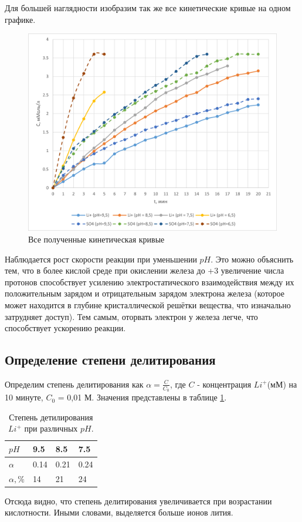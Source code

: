\documentclass[a4paper,12pt]{article} %
\begin{document}
Для большей наглядности изобразим так же все кинетические кривые на одном графике.
\begin{figure}[H]
    \centering
    \includegraphics[scale=1]{Рисунок5.png}
    \caption{Все полученные кинетическая кривые
}
    \label{pic:5}
\end{figure}

Наблюдается рост скорости реакции при уменьшении $pH$. Это можно объяснить тем, что в более кислой среде при окислении железа до +3 увеличение числа протонов способствует усилению электростатического взаимодействия между их положительным зарядом и отрицательным зарядом электрона железа (которое может находится в глубине кристаллической решётки вещества, что изначально затрудняет доступ). Тем самым, оторвать электрон у железа легче, что способствует ускорению реакции.

\subsection{Определение степени делитирования}

Определим степень делитирования как $\alpha = \frac{C}{C_0}$, где $C$ - концентрация $Li^+$(мМ) на 10 минуте, $C_0$ = 0,01 М. Значения представлены в таблице \ref{tab:5}. 

\begin{table}[H]
    \centering
    \begin{tabular}{|l|l|l|l|}
    \hline
        $pH$ & 9.5 & 8.5 & 7.5 \\ \hline
        $\alpha$ & 0.14 & 0.21 & 0.24 \\ \hline
        $\alpha, \%$ & 14 & 21 & 24 \\ \hline
    \end{tabular}
    \caption{Степень детилирования $Li^+$ при различных $pH$.}
    \label{tab:5}
\end{table}
Отсюда видно, что степень делитирования увеличивается при возрастании кислотности. Иными словами, выделяется больше ионов лития. 
\end{document}
